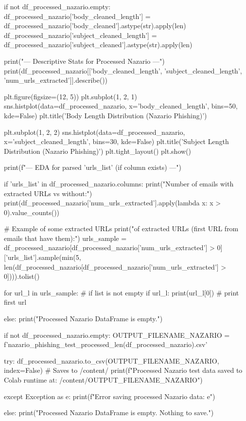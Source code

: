 \begin{ffcode}
    if not df_processed_nazario.empty:
    df_processed_nazario['body_cleaned_length'] = df_processed_nazario['body_cleaned'].astype(str).apply(len)
    df_processed_nazario['subject_cleaned_length'] = df_processed_nazario['subject_cleaned'].astype(str).apply(len)

    print("--- Descriptive Stats for Processed Nazario ---")
    print(df_processed_nazario[['body_cleaned_length', 'subject_cleaned_length', 'num_urls_extracted']].describe())

    plt.figure(figsize=(12, 5))
    plt.subplot(1, 2, 1)
    sns.histplot(data=df_processed_nazario, x='body_cleaned_length', bins=50, kde=False)
    plt.title('Body Length Distribution (Nazario Phishing)')

    plt.subplot(1, 2, 2)
    sns.histplot(data=df_processed_nazario, x='subject_cleaned_length', bins=30, kde=False)
    plt.title('Subject Length Distribution (Nazario Phishing)')
    plt.tight_layout()
    plt.show()

    print(f"\n--- EDA for parsed 'urls_list' (if column exists) ---")

    if 'urls_list' in df_processed_nazario.columns:
        print("Number of emails with extracted URLs vs without:")
        print(df_processed_nazario['num_urls_extracted'].apply(lambda x: x > 0).value_counts())

        # Example of some extracted URLs
        print("\nSample of extracted URLs (first URL from emails that have them):")
        urls_sample = df_processed_nazario[df_processed_nazario['num_urls_extracted'] > 0]['urls_list'].sample(min(5, len(df_processed_nazario[df_processed_nazario['num_urls_extracted'] > 0]))).tolist()

        for url_l in urls_sample:
            # if list is not empty
            if url_l:
                print(url_l[0]) # print first url

else:
    print("Processed Nazario DataFrame is empty.")

if not df_processed_nazario.empty:
    OUTPUT_FILENAME_NAZARIO = f'nazario_phishing_test_processed_{len(df_processed_nazario)}.csv'

    try:
        df_processed_nazario.to_csv(OUTPUT_FILENAME_NAZARIO, index=False) # Saves to /content/
        print(f"Processed Nazario test data saved to Colab runtime at: /content/{OUTPUT_FILENAME_NAZARIO}")

    except Exception as e:
        print(f"Error saving processed Nazario data: {e}")

else:
    print("Processed Nazario DataFrame is empty. Nothing to save.")
\end{ffcode}
